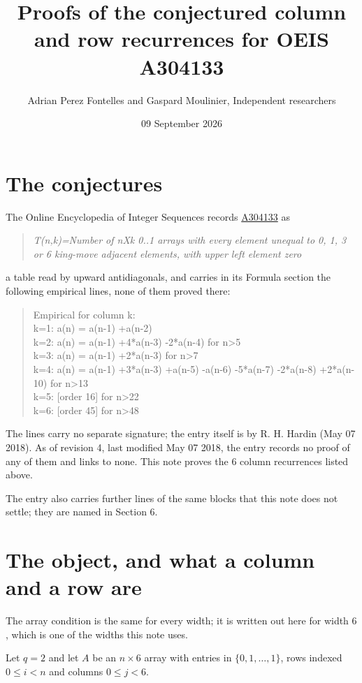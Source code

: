 \documentclass[11pt]{article}
\title{Proofs of the conjectured column and row recurrences for OEIS A304133}
\author{Adrian Perez Fontelles and Gaspard Moulinier, Independent researchers}
\date{09 September 2026}
\theoremstyle{definition}
\begin{document}
\maketitle
\section{The conjectures}

The Online Encyclopedia of Integer Sequences records \href{https://oeis.org/A304133}{A304133} as

\begin{quote}\itshape T(n,k)=Number of nXk 0..1 arrays with every element unequal to 0, 1, 3 or 6 king-move adjacent elements, with upper left element zero\end{quote}

a table read by upward antidiagonals, and carries in its Formula section the following empirical lines, none of them proved there:

\begin{quote}\ttfamily Empirical for column k:\\
k=1: a(n) = a(n-1) +a(n-2)\\k=2: a(n) = a(n-1) +4*a(n-3) -2*a(n-4) for n>5\\k=3: a(n) = a(n-1) +2*a(n-3) for n>7\\k=4: a(n) = a(n-1) +3*a(n-3) +a(n-5) -a(n-6) -5*a(n-7) -2*a(n-8) +2*a(n-10) for n>13\\k=5: [order 16] for n>22\\k=6: [order 45] for n>48\end{quote}

The lines carry no separate signature; the entry itself is by R. H. Hardin (May 07 2018). As of revision 4, last modified May 07 2018, the entry records no proof of any of them and links to none. This note proves the 6 column recurrences listed above.

The entry also carries further lines of the same blocks that this note does not settle; they are named in Section 6.

\section{The object, and what a column and a row are}

The array condition is the same for every width; it is written out here for width $6$, which is one of the widths this note uses.

Let $q = 2$ and let $A$ be an $n \times 6$ array with entries in $\{0,1,\dots,1\}$, rows indexed $0 \le i < n$ and columns $0 \le j < 6$.
\end{document}
